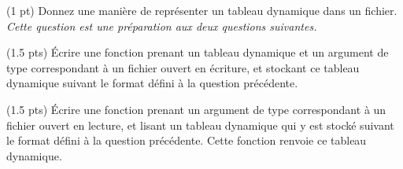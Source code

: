 \question (1 pt) Donnez une mani{\`e}re de repr{\'e}senter un tableau
dynamique dans un fichier. \emph{Cette question est une pr{\'e}paration
  aux deux questions suivantes.}

\question (1.5 pts) {\'E}crire une fonction prenant un tableau dynamique
et un argument de type  correspondant {\`a} un fichier
ouvert en {\'e}criture, et stockant ce tableau dynamique suivant le format
d{\'e}fini {\`a} la question pr{\'e}c{\'e}dente. 

\question (1.5 pts) {\'E}crire une fonction prenant un argument de type
 correspondant {\`a} un fichier ouvert en lecture, et lisant
un tableau dynamique qui y est stock{\'e} suivant le format d{\'e}fini {\`a} la
question pr{\'e}c{\'e}dente. Cette fonction renvoie ce tableau dynamique.
